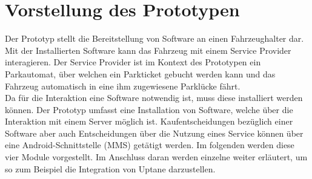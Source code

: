 \section{Vorstellung des Prototypen}\label{prototyp}
Der Prototyp stellt die Bereitstellung von Software an einen Fahrzeughalter dar. Mit der Installierten Software kann das Fahrzeug mit einem Service Provider interagieren. Der Service Provider ist im Kontext des Prototypen ein Parkautomat, über welchen ein Parkticket gebucht werden kann und das Fahrzeug automatisch in eine ihm zugewiesene Parklücke fährt. \\
Da für die Interaktion eine Software notwendig ist, muss diese installiert werden können. Der Prototyp umfasst eine Installation von Software, welche über die Interaktion mit einem Server möglich ist. Kaufentscheidungen bezüglich einer Software aber auch Entscheidungen über die Nutzung eines Service können über eine Android-Schnittstelle (MMS) getätigt werden. Im folgenden werden diese vier Module vorgestellt. Im Anschluss daran werden einzelne weiter erläutert, um so zum Beispiel die Integration von Uptane darzustellen.

